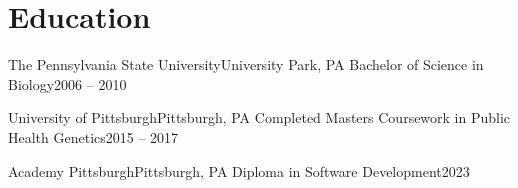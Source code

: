 
\section{Education}
\resumeSubHeadingListStart
  \resumeSubheading
    {The Pennsylvania State University}{University Park, PA}
    {Bachelor of Science in Biology}{2006 -- 2010}

  \resumeSubheading
    {University of Pittsburgh}{Pittsburgh, PA}
    {Completed Masters Coursework in Public Health Genetics}{2015 -- 2017}

  \resumeSubheading
    {Academy Pittsburgh}{Pittsburgh, PA}
    {Diploma in Software Development}{2023}
\resumeSubHeadingListEnd